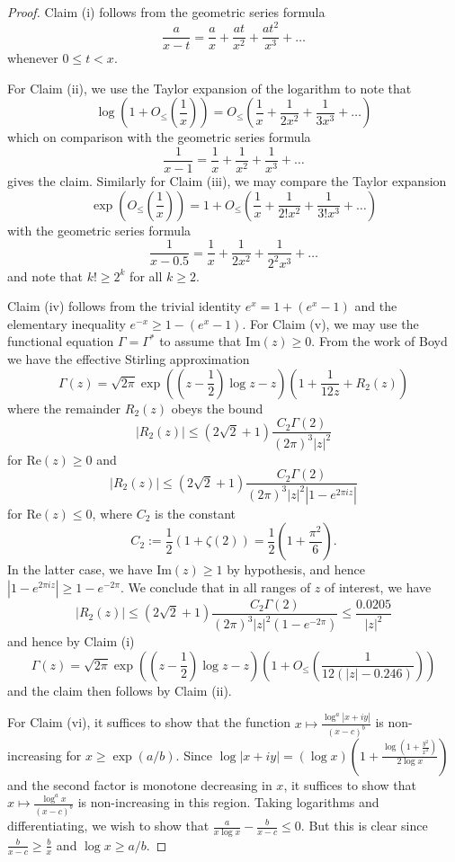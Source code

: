 \begin{proof}  Claim (i) follows from the geometric series formula
$$ \frac{a}{x-t} = \frac{a}{x} + \frac{at}{x^2} + \frac{at^2}{x^3} + \dots$$
whenever $0 \leq t < x$.

For Claim (ii), we use the Taylor expansion of the logarithm to note that
$$\log\left( 1 + O_{\leq}\left(\frac{1}{x}\right) \right) = O_{\leq}\left(\frac{1}{x} + \frac{1}{2x^2} + \frac{1}{3x^3} + \dots\right)$$
which on comparison with the geometric series formula
$$\frac{1}{x-1} = \frac{1}{x} + \frac{1}{x^2} + \frac{1}{x^3} + \dots$$
gives the claim.  Similarly for Claim (iii), we may compare the Taylor expansion
$$\exp\left( O_{\leq}\left(\frac{1}{x}\right) \right) = 1 + O_{\leq}\left(\frac{1}{x} + \frac{1}{2! x^2} + \frac{1}{3! x^3} + \dots\right)$$
with the geometric series formula
$$ \frac{1}{x-0.5} = \frac{1}{x} + \frac{1}{2x^2} + \frac{1}{2^2 x^3} + \dots$$
and note that $k! \geq 2^k$ for all $k \geq 2$.

Claim (iv) follows from the trivial identity $e^x = 1 + (e^x-1)$ and the elementary inequality $e^{-x} \geq 1 - (e^x-1)$.
For Claim (v), we may use the functional equation $\Gamma = \Gamma^*$ to assume that $\mathrm{Im}(z) \geq 0$.  From the work of Boyd \cite[(1.13), (3.1), (3.14), (3.15)]{boyd} we have the effective Stirling approximation
$$ \Gamma(z) = \sqrt{2\pi} \exp\left( \left(z-\frac{1}{2}\right) \log z - z \right) \left(1 + \frac{1}{12 z} + R_2(z) \right)$$
where the remainder $R_2(z)$ obeys the bound
$$ |R_2(z)| \leq (2 \sqrt{2}+1) \frac{C_2 \Gamma(2)}{(2\pi)^3 |z|^2} $$
for $\mathrm{Re}(z) \geq 0$ and
$$|R_2(z)| \leq (2 \sqrt{2}+1) \frac{C_2 \Gamma(2)}{(2\pi)^3 |z|^2 |1 - e^{2\pi i z}|} $$
for $\mathrm{Re}(z) \leq 0$, where $C_2$ is the constant
$$ C_2 := \frac{1}{2} (1 + \zeta(2)) = \frac{1}{2} \left(1 + \frac{\pi^2}{6}\right).$$
In the latter case, we have $\mathrm{Im}(z) \geq 1$ by hypothesis, and hence $|1 - e^{2\pi i z}| \geq 1 - e^{-2\pi}$.  We conclude that in all ranges of $z$ of interest, we have
$$|R_2(z)| \leq (2 \sqrt{2}+1) \frac{C_2 \Gamma(2)}{(2\pi)^3 |z|^2 (1 - e^{-2\pi})} \leq \frac{0.0205}{|z|^2}$$
and hence by Claim (i)
$$ \Gamma(z) = \sqrt{2\pi} \exp\left( \left(z-\frac{1}{2}\right) \log z - z \right) \left(1 + O_{\leq}\left( \frac{1}{12(|z| - 0.246)} \right)\right) $$
and the claim then follows by Claim (ii).  

For Claim (vi), it suffices to show that the function $x \mapsto \frac{\log^a |x+iy|}{(x-c)^b}$ is non-increasing for $x \geq \exp(a/b)$.  Since $\log |x+iy| = (\log x) (1 + \frac{\log(1 + \frac{y^2}{x^2})}{2 \log x})$ and the second factor is monotone decreasing in $x$, it suffices to show that $x \mapsto \frac{\log^a x}{(x-c)^b}$ is non-increasing in this region.  Taking logarithms and differentiating, we wish to show that $\frac{a}{x \log x} - \frac{b}{x-c} \leq 0$.  But this is clear since $\frac{b}{x-c} \geq \frac{b}{x}$ and $\log x \geq a/b$.
\end{proof}
